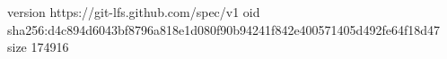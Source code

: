 version https://git-lfs.github.com/spec/v1
oid sha256:d4c894d6043bf8796a818e1d080f90b94241f842e400571405d492fe64f18d47
size 174916
